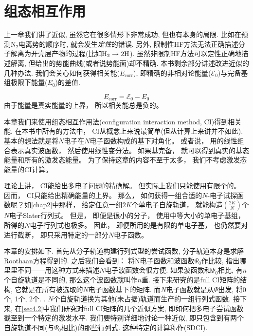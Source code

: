 \chapter{组态相互作用}
上一章我们讲了\hft 近似, 
虽然它在很多情形下非常成功, 
但也有本身的局限. 
\hft 比如在预测$\text{N}_2$电离势的顺序时, 
就会发生\emph{定性}的错误. 
另外, 
限制性HF方法无法正确描述分子解离为开壳层产物的过程(比如$\mathrm{H}_2\to2\text{H}$). 
虽然非限制HF方法可以定性正确地描述解离, 
但给出的势能曲线(或者说势能面)却不精确. 
本书剩余部分讲述改进\hft 近似的几种办法. 
我们会关心如何获得相关能($E_\mathrm{corr}$), 
即精确的非相对论能量($\mathscr{E}_0$)与完备基组极限下\hft 能量($E_0$)的差值.

\begin{equation}
E_\mathrm{corr}=\mathscr{E}_0-E_0
\end{equation}
由于\hft 能量是真实能量的上界，
所以相关能总是负的。


本章我们来使用组态相互作用法(configuration interaction method, 
CI)得到相关能. 
在本书中所有的方法中，
CI从概念上来说最简单(但从计算上来讲并不如此). 
基本的想法就是将$N$电子\ha 在$N$电子函数构成的基下对角化。
或者说，
用的线性组合表示真实波函数，
然后使用线性变分法。
如果基完备，
就可以得到真实的基态能量和所有的激发态能量。
为了保持这章的内容不至于太多，
我们不考虑激发态能量的CI计算。



理论上讲，
CI能给出多电子问题的精确解。
但实际上我们只能使用有限个的。
因而，
CI只能给出精确能量的上界。
那么，
如何获得一组合适的$N$-电子试探函数呢？如\ref{chap2}中那样，
给定任意一组$2K$个单电子自旋轨道，
就能构造$\binom{2K}{N}$个$N$电子Slater行列式。
但是，
即便是很小的分子，
使用中等大小的单电子基组，
所得的$N$电子行列式也极多。
因此，
即便所用的是有限的单电子基，
也仍然要对进行截断，
即只采用特定的一部分$N$电子函数。



本章的安排如下. 
首先从\hft 分子轨道构建行列式型的尝试函数, 
分子轨道本身是求解Roothaan方程得到的. 
之后我们会看到： 将N电子函数和\hft 波函数$\Psi_0$作比较, 
指出哪里里不同——用这种方式来描述$N$电子波函数会很方便. 
如果波函数和$\Psi_0$相比, 
有$n$个自旋轨道是不同的, 
那么这个波函数就叫作$n$重. 
接下来研究的是full CI矩阵的结构, 
它就是\ha 在所有被选取的$N$电子函数基下的矩阵. 
而$N$电子函数就是从$\Psi$出发, 
将0个, 
1个, 
2个.
. 
$N$个自旋轨道换为其他(未占据)轨道而生产的一组行列式函数. 
接下来, 
在\ref{sec4.2}中我们研究对full CI矩阵的几个近似方案, 
即如何把多电子尝试函数截至到一个特定的激发水平. 
我们要特别详细地讨论一种近似, 
即只包含到有两个自旋轨道不同(与$\Psi_0$相比)的那些行列式. 
这种特定的计算称作(SDCI).



